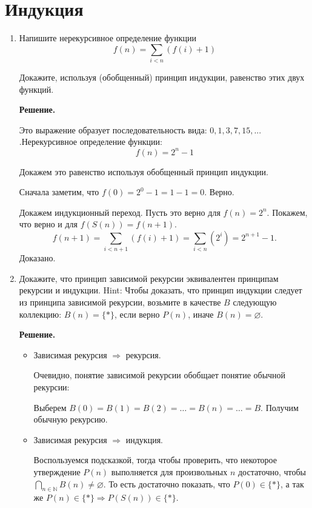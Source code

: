 \section*{Индукция}
\begin{enumerate}

\item Напишите нерекурсивное определение функции \[ f(n) = \sum_{i < n} (f(i) + 1) \]

Докажите, используя (обобщенный) принцип индукции, равенство этих двух функций.

\textbf{Решение.} 

Это выражение образует последовательность вида: $0, 1, 3, 7, 15,...$ .Нерекурсивное определение функции: 
\begin{equation*}
f(n) = 2^n - 1
\end{equation*}

Докажем это равенство используя обобщенный принцип индукции.

Сначала заметим, что $f(0) = 2^0 - 1 = 1 - 1 = 0$. Верно.

Докажем индукционный переход. Пусть это верно для $f(n) = 2^n$. Покажем, что верно и для $f(S(n)) = f(n + 1)$.
\begin{equation*}
f(n + 1) = \sum_{i < n + 1} (f(i) + 1) = \sum_{i<n}(2^i) = 2^{n + 1} - 1.
\end{equation*}
Доказано.

\item Докажите, что принцип зависимой рекурсии эквивалентен принципам рекурсии и индукции. Hint: Чтобы 
доказать, что принцип индукции следует из принципа зависимой рекурсии, возьмите в качестве $B$ следующую 
коллекцию: $B(n) = \{ * \}$, если верно $P(n)$, иначе $B(n) = \varnothing$.
    
\textbf{Решение.}

\begin{itemize}
	\item Зависимая рекурсия $\Rightarrow$ рекурсия.
	
	Очевидно, понятие зависимой рекурсии обобщает понятие обычной рекурсии:
	
	Выберем $B(0) = B(1) = B(2) = \ldots = B(n) = \ldots = B$. Получим обычную рекурсию.
	
	\item Зависимая рекурсия $\Rightarrow$ индукция.
	
	Воспользуемся подсказкой, тогда чтобы проверить, что некоторое утверждение $P(n)$ выполняется для 	
	произвольных $n$ достаточно, чтобы $\bigcap\limits_{n\in \mathbb{N}} B(n) \neq \varnothing$. То есть 
	достаточно показать, что $P(0)\in \{*\}$, а так же $P(n) \in \{*\} \Rightarrow P(S(n)) \in \{*\}$.
	

\end{itemize}
\end{enumerate}
